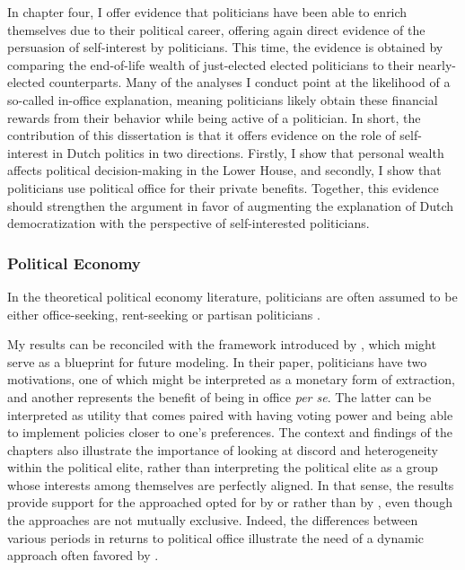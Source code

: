 In chapter four, I offer evidence that politicians have been able to enrich themselves due to their political career, offering again direct evidence of the persuasion of self-interest by politicians. This time, the evidence is obtained by comparing the end-of-life wealth of just-elected elected politicians to their nearly-elected counterparts. Many of the analyses I conduct point at the likelihood of a so-called in-office explanation, meaning politicians likely obtain these financial rewards from their behavior while being active of a politician. In short, the contribution of this dissertation is that it offers evidence on the role of self-interest in Dutch politics in two directions. Firstly, I show that personal wealth affects political decision-making in the Lower House, and secondly, I show that politicians use political office for their private benefits. Together, this evidence should strengthen the argument in favor of augmenting the explanation of Dutch democratization with the perspective of self-interested politicians. 


\subsubsection{Political Economy}

In the theoretical political economy literature, politicians are often assumed to be either office-seeking, rent-seeking or partisan politicians \citep{persson2002political}.  

My results can be reconciled with the framework introduced by \cite{svaleryd2009political}, which might serve as a blueprint for future modeling. In their paper, politicians have two motivations, one of which might be interpreted as a monetary form of extraction, and another represents the benefit of being in office \textit{per se}. The latter can be interpreted as utility that comes paired with having voting power and being able to implement policies closer to one's preferences. 
The context and findings of the chapters also illustrate the importance of looking at discord and heterogeneity within the political elite, rather than interpreting the political elite as a group whose interests among themselves are perfectly aligned. In that sense, the results provide support for the approached opted for by \cite{lizzeri2004did} or \cite{llavador2005partisan} rather than by \cite{acemoglu2013political}, even though the approaches are not mutually exclusive. Indeed, the differences between various periods in returns to political office illustrate the need of a dynamic approach often favored by \cite{acemoglu2013political}. 


